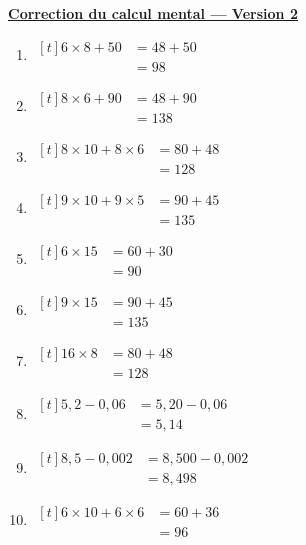 \documentclass[12pt,a4paper]{article}
\newcommand{\titreversion}[1]{%
  \begin{center}%
    {\Large\underline{\textbf{#1}}}%
  \end{center}%
}
\begin{document}
\titreversion{Correction du calcul mental --- Version 2}
\begin{enumerate}
\item {$\begin{aligned}[t]
6\times 8+50 &= 48+50\\
             &= \boxed{98}
\end{aligned}$}
\item {$\begin{aligned}[t]
8\times 6+90 &= 48+90\\
             &= \boxed{138}
\end{aligned}$}
\item {$\begin{aligned}[t]
8\times 10+8\times 6 &= 80+48\\
                     &= \boxed{128}
\end{aligned}$}
\item {$\begin{aligned}[t]
9\times 10+9\times 5 &= 90+45\\
                     &= \boxed{135}
\end{aligned}$}
\item {$\begin{aligned}[t]
6\times 15 &= 60+30\\
           &= \boxed{90}
\end{aligned}$}
\item {$\begin{aligned}[t]
9\times 15 &= 90+45\\
           &= \boxed{135}
\end{aligned}$}
\item {$\begin{aligned}[t]
16\times 8 &= 80+48\\
           &= \boxed{128}
\end{aligned}$}
\item {$\begin{aligned}[t]
5{,}2-0{,}06 &= 5{,}20-0{,}06\\
             &= \boxed{5{,}14}
\end{aligned}$}
\item {$\begin{aligned}[t]
8{,}5-0{,}002 &= 8{,}500-0{,}002\\
              &= \boxed{8{,}498}
\end{aligned}$}
\item {$\begin{aligned}[t]
6\times 10+6\times 6 &= 60+36\\
                     &= \boxed{96}
\end{aligned}$}
\end{enumerate}
\newpage
\end{document}
